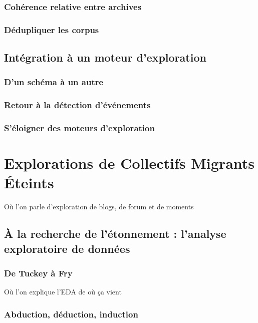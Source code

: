 \documentclass{tufte-book}
\begin{document}
\subsection{Cohérence relative entre archives}

\subsection{Dédupliquer les corpus}

\section{Intégration à un moteur d'exploration}

\subsection{D'un schéma à un autre}

\subsection{Retour à la détection d'événements}

\subsection{S'éloigner des moteurs d'exploration}


\chapter{Explorations de Collectifs Migrants Éteints}

Où l'on parle d'exploration de blogs, de forum et de moments

\section{À la recherche de l'étonnement : l'analyse exploratoire de données}

\subsection{De Tuckey à Fry}

Où l'on explique l'EDA de où ça vient 

\subsection{Abduction, déduction, induction}
\end{document}
